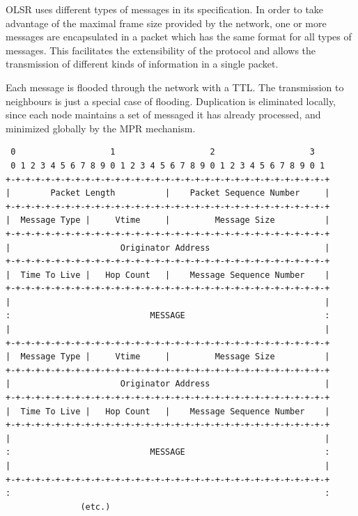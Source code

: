 \documentclass[oneside,openany]{memoir}
\begin{document}
OLSR uses different types of messages in its specification. In order to
take advantage of the maximal frame size provided by the network, one or
more messages are encapsulated in a packet which has the same format for
all types of messages. This facilitates the extensibility of the
protocol and allows the transmission of different kinds of information
in a single packet.

Each message is flooded through the network with a TTL. The transmission
to neighbours is just a special case of flooding. Duplication is
eliminated locally, since each node maintains a set of messaged it has
already processed, and minimized globally by the MPR mechanism.

\begin{verbatim}
 0                   1                   2                   3
 0 1 2 3 4 5 6 7 8 9 0 1 2 3 4 5 6 7 8 9 0 1 2 3 4 5 6 7 8 9 0 1
+-+-+-+-+-+-+-+-+-+-+-+-+-+-+-+-+-+-+-+-+-+-+-+-+-+-+-+-+-+-+-+-+
|        Packet Length          |    Packet Sequence Number     |
+-+-+-+-+-+-+-+-+-+-+-+-+-+-+-+-+-+-+-+-+-+-+-+-+-+-+-+-+-+-+-+-+
|  Message Type |     Vtime     |         Message Size          | 
+-+-+-+-+-+-+-+-+-+-+-+-+-+-+-+-+-+-+-+-+-+-+-+-+-+-+-+-+-+-+-+-+
|                      Originator Address                       |
+-+-+-+-+-+-+-+-+-+-+-+-+-+-+-+-+-+-+-+-+-+-+-+-+-+-+-+-+-+-+-+-+
|  Time To Live |   Hop Count   |    Message Sequence Number    |
+-+-+-+-+-+-+-+-+-+-+-+-+-+-+-+-+-+-+-+-+-+-+-+-+-+-+-+-+-+-+-+-+
|                                                               |
:                            MESSAGE                            :
|                                                               |
+-+-+-+-+-+-+-+-+-+-+-+-+-+-+-+-+-+-+-+-+-+-+-+-+-+-+-+-+-+-+-+-+
|  Message Type |     Vtime     |         Message Size          | 
+-+-+-+-+-+-+-+-+-+-+-+-+-+-+-+-+-+-+-+-+-+-+-+-+-+-+-+-+-+-+-+-+
|                      Originator Address                       |
+-+-+-+-+-+-+-+-+-+-+-+-+-+-+-+-+-+-+-+-+-+-+-+-+-+-+-+-+-+-+-+-+
|  Time To Live |   Hop Count   |    Message Sequence Number    |
+-+-+-+-+-+-+-+-+-+-+-+-+-+-+-+-+-+-+-+-+-+-+-+-+-+-+-+-+-+-+-+-+
|                                                               |
:                            MESSAGE                            :
|                                                               |
+-+-+-+-+-+-+-+-+-+-+-+-+-+-+-+-+-+-+-+-+-+-+-+-+-+-+-+-+-+-+-+-+
:                                                               :
               (etc.)
\end{verbatim}
\end{document}
